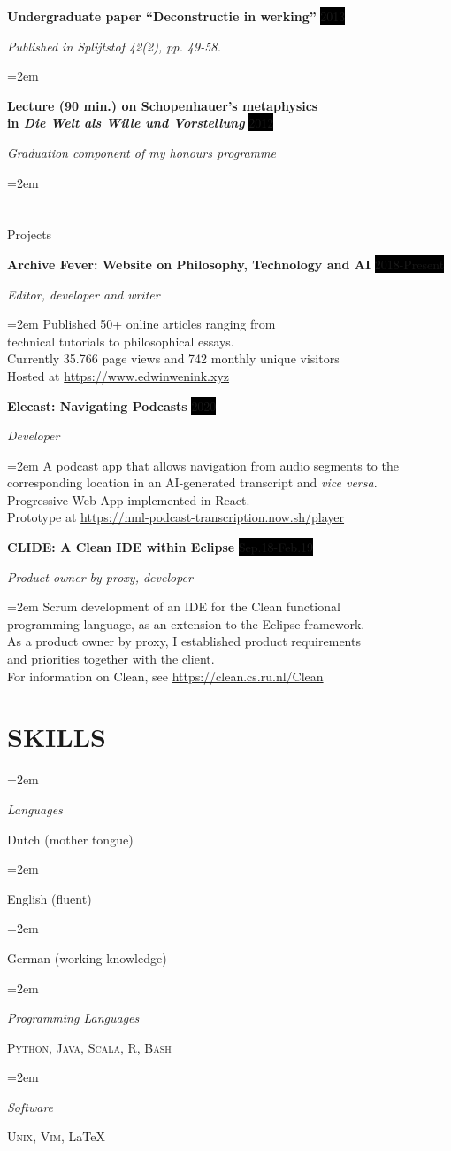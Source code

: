 \documentclass{article}
\newlength{\spacebox}
\newcommand{\sepspace}{\vspace*{1em}}		%
\newcommand{\NewPart}[1]{\section*{\uppercase{#1}}}
\newcommand{\PersonalEntry}[2]{
		\noindent\hangindent=2em\hangafter=0 %
		\parbox{\spacebox}{        %
		\textit{#1}}		       %
		\hspace{1.5em} #2 \par}    %
\newcommand{\SkillsEntry}[2]{      %
		\noindent\hangindent=2em\hangafter=0 %
		\parbox{\spacebox}{        %
		\textit{#1}}			   %
		\hspace{1.5em} #2 \par}    %
\newcommand{\EducationEntry}[4]{
		\noindent \textbf{#1} \hfill      %
		\colorbox{Black}{%
			\parbox{6em}{%
			\hfill\color{White}#2}} \par  %
		\noindent \textit{#3} \par        %
		\noindent\hangindent=2em\hangafter=0 \small #4 %
		\normalsize \par}
\newcommand{\WorkEntry}[4]{				  %
		\noindent \textbf{#1} \hfill      %
		\colorbox{Black}{\color{White}#2} \par  %
		\noindent \textit{#3} \par              %
		\noindent\hangindent=2em\hangafter=0 \small #4 %
		\normalsize \par}
\begin{document}
\WorkEntry{Undergraduate paper ``Deconstructie in werking''}{2013}{Published in \textit{Splijtstof} 42(2), pp. 49-58.}
\sepspace

\WorkEntry{Lecture (90 min.) on Schopenhauer's metaphysics\\
in \textit{Die Welt als Wille und Vorstellung}}{2012}{Graduation component of my honours programme}

\NewPart{Projects}{}

\WorkEntry{Archive Fever: Website on Philosophy, Technology and AI}{2018-Present}{Editor, developer and writer}{Published 50+ online articles ranging from\\
	technical tutorials to philosophical essays.\\
	Currently 35.766 page views and 742 monthly unique visitors\\
	Hosted at \url{https://www.edwinwenink.xyz}
}
\sepspace

\WorkEntry{Elecast: Navigating Podcasts}{2020}{Developer}{A podcast app that allows navigation from audio segments to the\\ corresponding location in an AI-generated transcript and \textit{vice versa}.\\
Progressive Web App implemented in React.\\
Prototype at \url{https://nml-podcast-transcription.now.sh/player}}
\sepspace

\WorkEntry{CLIDE: A Clean IDE within Eclipse}{Sep.18-Feb.19}{Product owner by proxy, developer}{Scrum development of an IDE for the Clean functional\\ 
programming language, as an extension to the Eclipse framework.\\
As a product owner by proxy, I established product requirements\\
and priorities together with the client. \\
For information on Clean, see \url{https://clean.cs.ru.nl/Clean}}
\sepspace


\NewPart{Skills}{}

\SkillsEntry{Languages}{Dutch (mother tongue)}
\SkillsEntry{}{English (fluent)}
\SkillsEntry{}{German (working knowledge)}
\sepspace

\SkillsEntry{Programming Languages}{\textsc{Python}, \textsc{Java}, \textsc{Scala}, \textsc{R}, \textsc{Bash}}
\sepspace

\SkillsEntry{Software}{\textsc{Unix}, \textsc{Vim}, \LaTeX}
\sepspace

\end{document}
